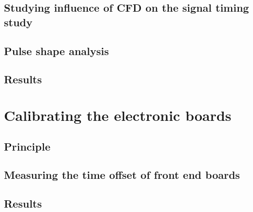 \subsection{Studying influence of CFD on the signal timing study}
\label{subsec:CFD}

\subsection{Pulse shape analysis}
\label{subsec:pulse_shape}


\subsection{Results}



\section{Calibrating the electronic boards}
\label{sec:TimeSynchroFEB}

\subsection{Principle}
\subsection{Measuring the time offset of front end boards}
\subsection{Results}
